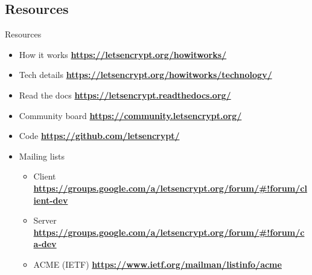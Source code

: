 \documentclass[xcolor=svgnames,11pt]{beamer}
\begin{document}
\subsection{Resources}
\begin{frame}{Resources}
\begin{small}
\begin{itemize}
  \item How it works \textbf{\url{https://letsencrypt.org/howitworks/}}
  \medskip
  \item Tech details \textbf{\url{https://letsencrypt.org/howitworks/technology/}}
  \medskip
  \item Read the docs \textbf{\url{https://letsencrypt.readthedocs.org/}}
  \medskip
  \item Community board \textbf{\url{https://community.letsencrypt.org/}}
  \medskip
  \item Code \textbf{\url{https://github.com/letsencrypt/}}
  \medskip
  \item Mailing lists
  \begin{itemize}
    \item Client \textbf{\url{https://groups.google.com/a/letsencrypt.org/forum/\#!forum/client-dev}}
    \item Server \textbf{\url{https://groups.google.com/a/letsencrypt.org/forum/\#!forum/ca-dev}}
    \item ACME (IETF) \textbf{\url{https://www.ietf.org/mailman/listinfo/acme}}
  \end{itemize}
\end{itemize}
\end{small}
\end{frame}
\end{document}
